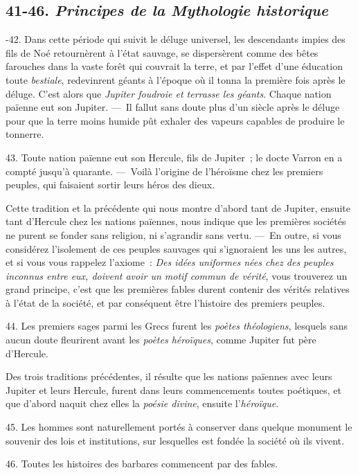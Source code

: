 \documentclass[french,twoside]{book} %
\begin{document}
\subsection[{41-46. Principes de la Mythologie historique}]{ \textsc{41-46. } {\itshape Principes de la Mythologie historique} }
-42. Dans cette période qui suivit le déluge universel, les descendants impies des fils de Noé retournèrent à l’état sauvage, se dispersèrent comme des bêtes farouches dans la vaste forêt qui couvrait la terre, et par l’effet d’une éducation toute {\itshape bestiale}, redevinrent géants à l’époque où il tonna la première fois après le déluge. C’est alors que {\itshape Jupiter foudroie et terrasse les géants}. Chaque nation païenne eut son Jupiter. — Il fallut sans doute plus d’un siècle après le déluge pour que la terre moins humide pût exhaler des vapeurs capables de produire le tonnerre.\par
43. Toute nation païenne eut son Hercule, fils de Jupiter ; le docte Varron en a compté jusqu’à quarante. — Voilà l’origine de l’héroïsme chez les  premiers peuples, qui faisaient sortir leurs héros des dieux.\par
Cette tradition et la précédente qui nous montre d’abord tant de Jupiter, ensuite tant d’Hercule chez les nations païennes, nous indique que les premières sociétés ne purent se fonder sans religion, ni s’agrandir sans vertu. — En outre, si vous considérez l’isolement de ces peuples sauvages qui s’ignoraient les uns les autres, et si vous vous rappelez l’axiome : {\itshape Des idées uniformes nées chez des peuples inconnus entre eux, doivent avoir un motif commun de vérité}, vous trouverez un grand principe, c’est que les premières fables durent contenir des vérités relatives à l’état de la société, et par conséquent être l’histoire des premiers peuples.\par
44. Les premiers sages parmi les Grecs furent les {\itshape poètes théologiens}, lesquels sans aucun doute fleurirent avant les {\itshape poètes héroïques}, comme Jupiter fut père d’Hercule.\par
Des trois traditions précédentes, il résulte que les nations païennes avec leurs Jupiter et leurs Hercule, furent dans leurs commencements toutes poétiques, et que d’abord naquit chez elles la {\itshape poésie divine}, ensuite l’{\itshape héroïque}.\par
45. Les hommes sont naturellement portés à conserver dans quelque monument le souvenir des lois et institutions, sur lesquelles est fondée la société où ils vivent.\par
 46. Toutes les histoires des barbares commencent par des fables.
\end{document}
